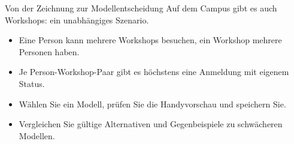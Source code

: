 \begin{frame}[t]{Von der Zeichnung zur Modellentscheidung}
Auf dem Campus gibt es auch Workshops: ein unabhängiges Szenario.
\medskip
\begin{itemize}
\item Eine Person kann mehrere Workshops besuchen, ein Workshop mehrere Personen haben.
\item Je Person-Workshop-Paar gibt es höchstens eine Anmeldung mit eigenem Status.
\item Wählen Sie ein Modell, prüfen Sie die Handyvorschau und speichern Sie.
\item Vergleichen Sie gültige Alternativen und Gegenbeispiele zu schwächeren Modellen.
\end{itemize}
\end{frame}
